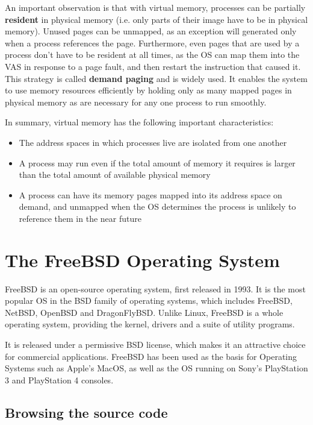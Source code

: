 \documentclass[shortabstract, english]{iithesis}
\begin{document}
An important observation is that with virtual memory, processes can be partially
\textbf{resident} in physical memory (i.e. only parts of their image have to be
in physical memory). Unused pages can be unmapped, as an exception will
generated only when a process references the page. Furthermore, even pages that
are used by a process don't have to be resident at all times, as the OS can map
them into the VAS in response to a page fault, and then restart the instruction
that caused it. This strategy is called \textbf{demand paging} and is widely
used. It enables the system to use memory resources efficiently by holding only
as many mapped pages in physical memory as are necessary for any one process to
run smoothly.

In summary, virtual memory has the following important characteristics:
\begin{itemize}
\item The address spaces in which processes live are isolated from one another
\item A process may run even if the total amount of memory it requires is larger
  than the total amount of available physical memory
\item A process can have its memory pages mapped into its address space on
  demand, and unmapped when the OS determines the process is unlikely to
  reference them in the near future
\end{itemize}

\section{The FreeBSD Operating System}

FreeBSD \cite{bib:freebsd} is an open-source operating system, first released in
1993. It is the most popular OS in the BSD family of operating systems, which
includes FreeBSD, NetBSD, OpenBSD and DragonFlyBSD. Unlike Linux, FreeBSD is a
whole operating system, providing the kernel, drivers and a suite of utility
programs.

It is released under a permissive BSD license, which makes it an attractive
choice for commercial applications. FreeBSD has been used as the basis for
Operating Systems such as Apple's MacOS, as well as the OS running on Sony's
PlayStation 3 and PlayStation 4 consoles.

\subsection{Browsing the source code}
\end{document}
